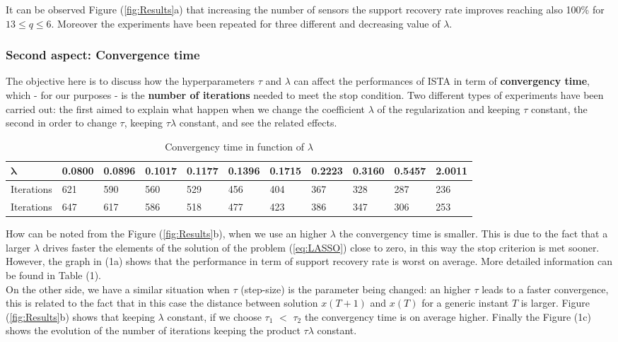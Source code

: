 It can be observed Figure (\ref{fig:Results}a) that increasing the number of sensors the support recovery rate improves reaching also 100\% for $13\le q \le6$. Moreover the experiments have been repeated for three different and decreasing value of $\lambda$. 

\subsubsection*{Second aspect: Convergence time}

The objective here is to discuss how the hyperparameters $\tau$ and $\lambda$ can affect the performances of ISTA in term of \textbf{convergency time}, which - for our purposes - is the \textbf{number of iterations} needed to meet the stop condition. Two different types of experiments have been carried out: the first aimed to explain what happen when we change the coefficient $\lambda$ of the regularization and keeping $\tau$ constant, the second in order to change $\tau$, keeping $\tau\lambda$ constant, and see the related effects.\\
\vspace{-0.4cm}
\begin{table}[h] \label{table:1}
    \centering
    \begin{tabular}{| p{2cm} || p{1cm} |p{1cm} |p{1cm} |p{1cm} |p{1cm} |p{1cm} |p{1cm} |p{1cm} |p{1cm} |p{1cm} | }
        \hline
        $\boldsymbol{\lambda}$&0.0800&0.0896&0.1017&0.1177&0.1396&0.1715&0.2223&0.3160&0.5457&2.0011\\
        \hline
        {\color{blue}Iterations}  &621&590&560&529&456&404&367&328&287&236\\
        \hline
        {\color{red}Iterations}  &647&617&586&518&477&423&386&347&306&253\\
        \hline    
    \end{tabular}
    \caption{Convergency time in function of $\lambda$}
    \vspace{-0.3cm}
\end{table}

\noindent
How can be noted from the Figure (\ref{fig:Results}b), when we use an higher $\lambda$ the convergency time is smaller. This is due to the fact that a larger $\lambda$ drives faster the elements of the solution of the problem (\ref{eq:LASSO}) close to zero, in this way the stop criterion is met sooner. However, the graph in (1a) shows that the performance in term of support recovery rate is worst on average. More detailed information can be found in Table (1).\\
On the other side, we have a similar situation when $\tau$ (step-size) is the parameter being changed: an higher $\tau$ leads to a faster convergence, this is related to the fact that in this case the distance between solution $x(T+1)$ and $x(T)$ for a generic instant $T$ is larger. Figure (\ref{fig:Results}b) shows that keeping $\lambda$ constant, if we choose  {{\color{red}$\tau_1$} $<$ {\color{blue}$\tau_2$}} the convergency time is on average higher. Finally the Figure (1c) shows the evolution of the number of iterations keeping the product $\tau\lambda$ constant.

